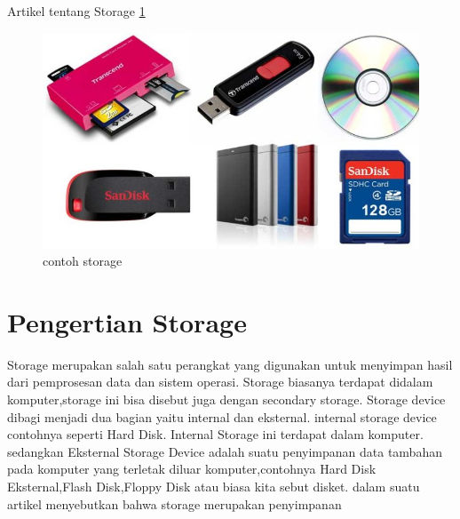 






Artikel tentang Storage
\ref{storage}
\begin{figure}[ht]
\centerline{\includegraphics[width=1\textwidth]{figures/storage.jpg}}
\caption{contoh storage}
\label{storage}
\end{figure}





\section{Pengertian Storage}

Storage merupakan salah satu perangkat yang digunakan untuk menyimpan hasil dari pemprosesan data dan sistem operasi. Storage biasanya terdapat didalam komputer,storage ini bisa disebut juga dengan secondary storage.
Storage device dibagi menjadi dua bagian yaitu internal dan eksternal. internal storage device contohnya seperti Hard Disk. Internal Storage ini terdapat dalam komputer. sedangkan Eksternal Storage Device adalah suatu penyimpanan data tambahan pada komputer yang terletak diluar komputer,contohnya Hard Disk Eksternal,Flash Disk,Floppy Disk atau biasa kita sebut disket.
dalam suatu artikel menyebutkan bahwa storage merupakan penyimpanan \cite{weiser1999personal}

